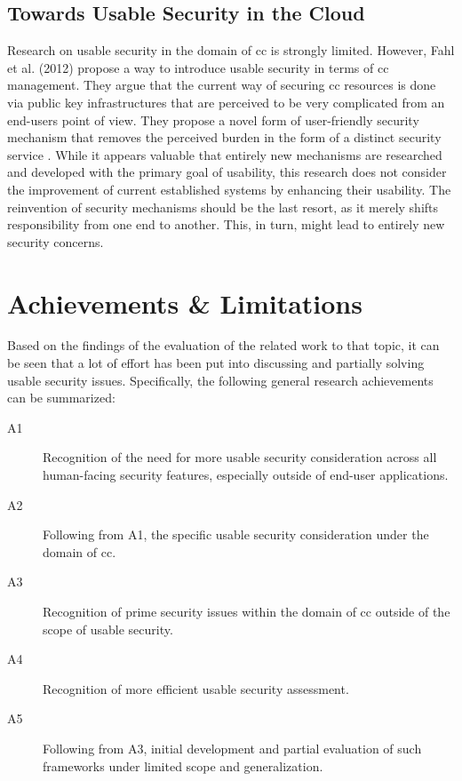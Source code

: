 \subsection{Towards Usable Security in the Cloud}
Research on usable security in the domain of \ac{cc} is strongly limited. However, Fahl et al. (2012) propose a way to introduce usable security in terms of \ac{cc} management. They argue that the current way of securing \ac{cc} resources is done via public key infrastructures that are perceived to be very complicated from an end-users point of view. They propose a novel form of user-friendly security mechanism that removes the perceived burden in the form of a distinct security service \cite{fahl_confidentiality_2012}. While it appears valuable that entirely new mechanisms are researched and developed with the primary goal of usability, this research does not consider the improvement of current established systems by enhancing their usability. The reinvention of security mechanisms should be the last resort, as it merely shifts responsibility from one end to another. This, in turn, might lead to entirely new security concerns.

\section{Achievements \& Limitations}

Based on the findings of the evaluation of the related work to that topic, it can be seen that a lot of effort has been put into discussing and partially solving usable security issues. Specifically, the following general research achievements can be summarized:

\begin{description}
	\item[A1] Recognition of the need for more usable security consideration across all human-facing security features, especially outside of end-user applications.
	\item[A2] Following from A1, the specific usable security consideration under the domain of \ac{cc}.
	\item[A3] Recognition of prime security issues within the domain of \ac{cc} outside of the scope of usable security.
	\item[A4] Recognition of more efficient usable security assessment.
	\item[A5] Following from A3, initial development and partial evaluation of such frameworks under limited scope and generalization.
\end{description}	

